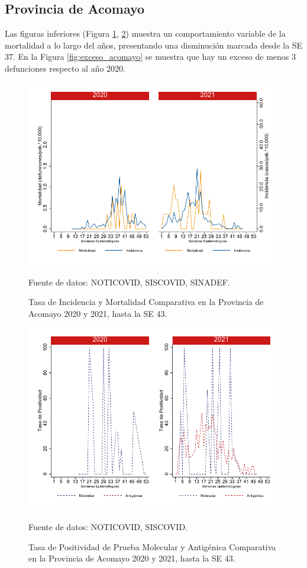 \documentclass[12pt,a4paper,openany]{book}
\begin{document}
		\subsection*{Provincia de Acomayo}
		\noindent Las figuras inferiores (Figura \ref{fig:inc_mort_acomayo}, \ref{fig:positividad_acomayo}) muestra un comportamiento variable de la mortalidad a lo largo del años, presentando una disminución marcada desde la SE 37. En la Figura \ref{fig:exceso_acomayo} se muestra que hay un exceso de menos 3 defunciones respecto al año 2020.
		
		\begin{figure}[h]
			\caption{Tasa de Incidencia y Mortalidad Comparativa en la Provincia de Acomayo 2020 y 2021, hasta la SE 43. }\label{fig:inc_mort_acomayo}
			\begin{center}
				\includegraphics[width=0.7\linewidth]{../figuras/incidencia_mortalidad_20_21_1}
			\end{center}
			{\footnotesize {Fuente de datos: NOTICOVID, SISCOVID, SINADEF.}}
		\end{figure}
		
		\begin{figure}[h]
			\caption{Tasa de Positividad de Prueba Molecular y Antigénica Comparativa en la Provincia de Acomayo 2020 y 2021, hasta la SE 43. }\label{fig:positividad_acomayo}
			\begin{center}
				\includegraphics[width=0.7\linewidth]{../figuras/positividad_20_21_1}
			\end{center}
			{\footnotesize {Fuente de datos: NOTICOVID, SISCOVID.}}
		\end{figure}
		
\end{document}
